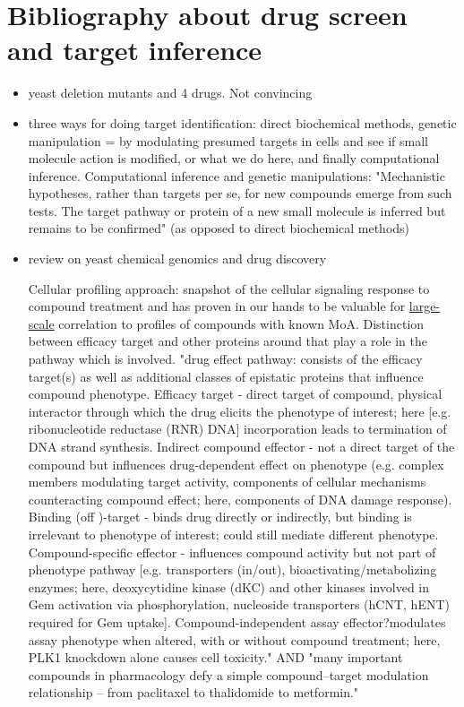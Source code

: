 \documentclass[12pt]{article}
\begin{document}
\section{Bibliography about drug screen and target inference}
\begin{itemize}
\item \cite{pmid20418956} yeast deletion mutants and 4 drugs. Not convincing

\item \cite{pmid23508189} three ways for doing target identification: direct biochemical methods, genetic manipulation = by modulating presumed targets in cells and see if small molecule action is modified, or what we do here, and finally computational inference. Computational inference and genetic manipulations: "Mechanistic hypotheses, rather than targets per se, for new compounds emerge from such tests. The target pathway or protein of a new small molecule is inferred but remains to be confirmed" (as opposed to direct biochemical methods)
\item \cite{pmid18755517} review on yeast chemical genomics and drug discovery

Cellular profiling approach: snapshot of the cellular signaling response to compound treatment and has proven in our hands to be valuable for \underline{large-scale} correlation to profiles of compounds with known MoA. Distinction between efficacy target and  other proteins around that play a role in the pathway which is involved. "drug effect pathway: consists of the efficacy target(s) as well as additional classes of epistatic proteins that influence compound phenotype. Efficacy target - direct target of compound, physical interactor through which the drug elicits the phenotype of interest; here [e.g.
ribonucleotide reductase (RNR) DNA] incorporation leads to termination of DNA strand synthesis. Indirect compound effector - not a direct target of the
compound but influences drug-dependent effect on phenotype (e.g. complex members modulating target activity, components of cellular mechanisms
counteracting compound effect; here, components of DNA damage response). Binding (off )-target - binds drug directly or indirectly, but binding is irrelevant to
phenotype of interest; could still mediate different phenotype. Compound-specific effector - influences compound activity but not part of phenotype pathway
[e.g. transporters (in/out), bioactivating/metabolizing enzymes; here, deoxycytidine kinase (dKC) and other kinases involved in Gem activation via
phosphorylation, nucleoside transporters (hCNT, hENT) required for Gem uptake]. Compound-independent assay effector?modulates assay phenotype when
altered, with or without compound treatment; here, PLK1 knockdown alone causes cell toxicity." AND "many important compounds in pharmacology defy a simple compound–target modulation relationship – from paclitaxel to thalidomide to metformin."~\cite{pmid26272035}


\end{itemize}
\end{document}
